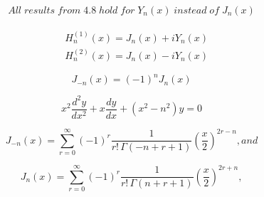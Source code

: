\[\begin{align} \label{thrm4.9} All \; results \; from \; 4.8 \; hold \; for \; Y_n(x) \; instead \; of \; J_n(x) \end{align}\]

\[\begin{align} \label{hankdef} & H_n^{(1)}(x) = J_n(x) + iY_n(x)\\\ & H_n^{(2)}(x) = J_n(x) - iY_n(x) \end{align}\]

\[\begin{equation} J_{-n}(x)=(-1)^{n}J_{n}(x) \end{equation}\]

\[\begin{equation} x^{2}{\frac {d^{2}y}{dx^{2}}}+x{\frac {dy}{dx}}+(x^{2}-n ^{2})y=0 \end{equation}\]

\[\begin{equation} \label{besselfirst1} J_{-n}(x)=\sum _{r=0}^{\infty }(-1)^r{\frac {1}{r!\,\Gamma (-n+r +1)}}{\left({\frac {x}{2}}\right)}^{2r-n }, and \end{equation}\]

\[\begin{equation} \label{besselfirstn} J_{n }(x)=\sum _{r=0}^{\infty }(-1)^r{\frac {1}{r!\,\Gamma (n+r +1)}}{\left({\frac {x}{2}}\right)}^{2r+n }, \end{equation}\]

